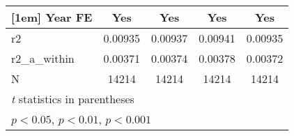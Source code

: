 {\begin{tabular}{l*{4}{c}}
[1em]
Year FE     &         Yes         &         Yes         &         Yes         &         Yes         \\
\hline
r2          &     0.00935         &     0.00937         &     0.00941         &     0.00935         \\
r2\_a\_within &     0.00371         &     0.00374         &     0.00378         &     0.00372         \\
N           &       14214         &       14214         &       14214         &       14214         \\
\hline\hline
\multicolumn{5}{l}{\footnotesize \textit{t} statistics in parentheses}\\
\multicolumn{5}{l}{\footnotesize \sym{*} \(p<0.05\), \sym{**} \(p<0.01\), \sym{***} \(p<0.001\)}\\
\end{tabular}
}
